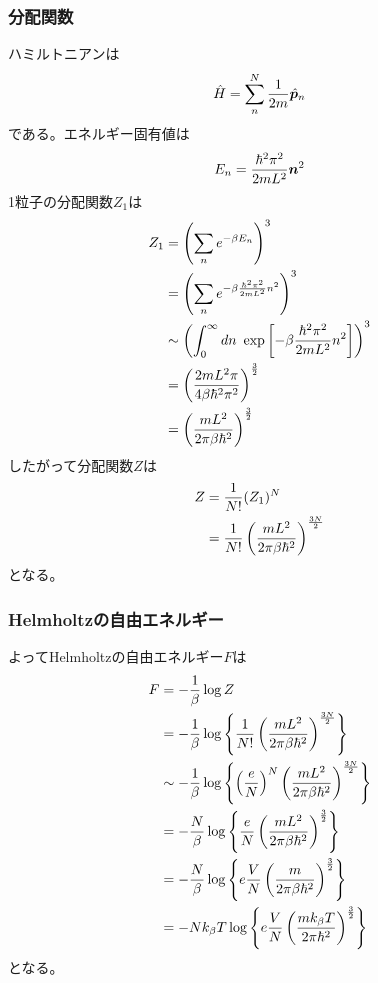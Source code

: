 \documentclass[dvipdfmx, 11pt, a4paper]{jsarticle}
\theoremstyle{definition}
\begin{document}
\subsubsection{分配関数}
    ハミルトニアンは
    \begin{align}
        \hat{H} = \sum_n^N \frac{1}{2m} \hat{\bm{p}}_n \notag 
    \end{align}
    である。エネルギー固有値は
    \begin{align}
        E_n = \frac{\hbar^2 \pi^2}{2mL^2} \bm{n}^2 \notag 
    \end{align}
    1粒子の分配関数$Z_1$は
    \begin{align}
        Z_1 &= \left( \sum_n e^{-\beta E_n} \right)^3 \notag \\
        &= \left( \sum_n e^{-\beta \frac{\hbar^2 \pi^2}{2mL^2} n^2} \right)^3 \notag \\
        &\sim \left( \int_0^\infty dn\ \exp\left[ -\beta \frac{\hbar^2 \pi^2}{2mL^2} n^2 \right] \right)^3 \notag \\
        &= \left( \frac{2mL^2 \pi}{4\beta \hbar^2 \pi^2} \right)^{\frac{3}{2}} \notag \\
        &= \left( \frac{mL^2}{2\pi \beta \hbar^2 } \right)^{\frac{3}{2}} \notag 
    \end{align}
    したがって分配関数$Z$は
    \begin{align}
        Z &= \frac{1}{N!} (Z_1)^N \notag \\
        &= \frac{1}{N!} \left( \frac{mL^2}{2\pi \beta \hbar^2 } \right)^{\frac{3N}{2}}
    \end{align}
    となる。
\subsubsection{Helmholtzの自由エネルギー}
    よってHelmholtzの自由エネルギー$F$は
    \begin{align}
        F &= -\frac{1}{\beta} \log Z \notag \\
        &= -\frac{1}{\beta} \log \left\{ \frac{1}{N!} \left( \frac{mL^2}{2\pi \beta \hbar^2 } \right)^{\frac{3N}{2}} \right\} \notag \\
        &\sim -\frac{1}{\beta} \log \left\{ \left( \frac{e}{N} \right)^N \left( \frac{mL^2}{2\pi \beta \hbar^2 } \right)^{\frac{3N}{2}} \right\} \notag \\
        &= -\frac{N}{\beta} \log \left\{ \frac{e}{N} \left( \frac{mL^2}{2\pi \beta \hbar^2 } \right)^{\frac{3}{2}} \right\} \notag \\
        &= -\frac{N}{\beta} \log \left\{ e\frac{V}{N} \left( \frac{m}{2\pi \beta \hbar^2 } \right)^{\frac{3}{2}} \right\} \notag \\
        &= -Nk_\beta T \log \left\{ e\frac{V}{N} \left( \frac{mk_\beta T}{2\pi \hbar^2 } \right)^{\frac{3}{2}} \right\}
    \end{align}
    となる。
\end{document}
